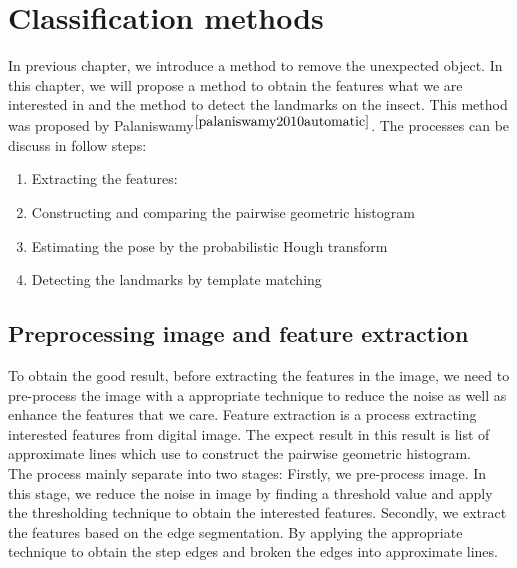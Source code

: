 \chapter{Classification methods }
In previous chapter, we introduce a method to remove the unexpected object. In this chapter, we will propose a method to obtain the features what we are interested in and the method to detect the landmarks on the insect. This method was proposed by Palaniswamy$^{\cite{palaniswamy2010automatic}}$. The processes can be discuss in follow steps:
\begin{enumerate}
\item Extracting the features:
\item Constructing and comparing the pairwise geometric histogram
\item Estimating the pose by the probabilistic Hough transform
\item Detecting the landmarks by template matching
\end{enumerate}
\section{Preprocessing image and feature extraction}
To obtain the good result, before extracting the features in the image, we need to pre-process the image with a appropriate technique to reduce the noise as well as enhance the features that we care. 
Feature extraction is a process extracting interested features from digital image. The expect result in this result is list of approximate lines which use to construct the pairwise geometric histogram. \\[0.2cm]
The process mainly separate into two stages: Firstly, we pre-process image. In this stage, we reduce the noise in image by finding a threshold value and apply the thresholding technique to obtain the interested features. Secondly, we extract the features based on the edge segmentation. By applying the appropriate technique to obtain the step edges and broken the edges into approximate lines.
